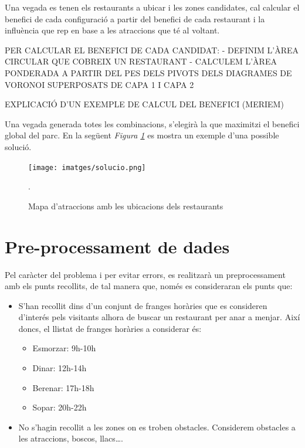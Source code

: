 \documentclass[12pt]{article}
\begin{document}
Una vegada es tenen els restaurants a ubicar i les zones candidates, cal calcular el benefici de cada configuració a partir del benefici de cada restaurant i la influència que rep en base a les atraccions que té al voltant.  

PER CALCULAR EL BENEFICI DE CADA CANDIDAT:
- DEFINIM L'ÀREA CIRCULAR QUE COBREIX UN RESTAURANT
- CALCULEM L'ÀREA PONDERADA A PARTIR DEL PES DELS PIVOTS DELS DIAGRAMES DE VORONOI SUPERPOSATS DE CAPA 1 I CAPA 2

EXPLICACIÓ D'UN EXEMPLE DE CALCUL DEL BENEFICI (MERIEM)

Una vegada generada totes les combinacions, s'elegirà la que maximitzi el benefici global del parc. En la següent \textit{Figura \ref{fig:mapa_restaurants}} es mostra un exemple d'una possible solució.

\begin{figure}[H]
	\centering
	\texttt{[image: imatges/solucio.png]}\par\vspace{1cm}
	\caption{Mapa d'atraccions amb les ubicacions dels restaurants}.
	\label{fig:mapa_restaurants}
\end{figure}


\section{Pre-processament de dades\label{pd}}
Pel caràcter del problema i per evitar errors, es realitzarà un preprocessament amb els punts recollits, de tal manera que, només es consideraran els punts que:
\begin{itemize}
	\item S’han recollit dins d’un conjunt de franges horàries que es consideren d'interés pels visitants alhora de buscar un restaurant per anar a menjar. 
	Així doncs, el llistat de franges horàries a considerar és:
	\begin{itemize}
		\item Esmorzar: 9h-10h
		\item Dinar: 12h-14h
		\item Berenar: 17h-18h
		\item Sopar: 20h-22h
	\end{itemize}

	\item No s’hagin recollit a les zones on es troben obstacles. 
	Considerem obstacles a les atraccions, boscos, llacs….
\end{itemize}
\end{document}
